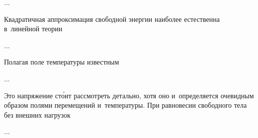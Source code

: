 ...




\begin{otherlanguage}{russian}

Квадратичная аппроксимация свободной энергии наиболее естественна в~линейной теории

...



\end{otherlanguage}



\begin{otherlanguage}{russian}

Полагая поле температуры известным

...



\end{otherlanguage}



\begin{otherlanguage}{russian}

Это напряжение ст\'{о}ит рассмотреть детально, хотя оно и~определяется очевидным образом полями перемещений и~температуры. При равновесии свободного тела без внешних нагрузок

...



\end{otherlanguage}

